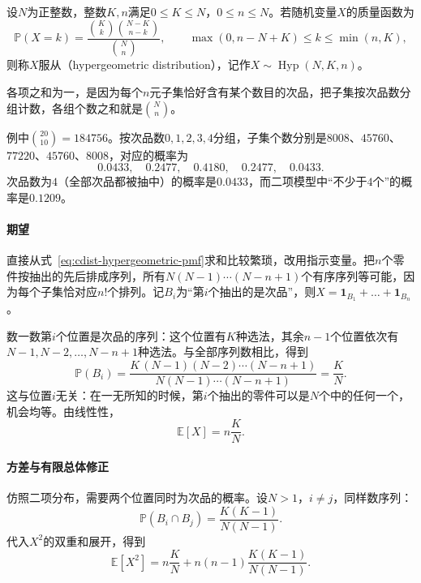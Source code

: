 \begin{definition}[超几何分布]
\label{def:cdist-hypergeometric}
设$N$为正整数，整数$K,n$满足$0\leq K\leq N$，$0\leq n\leq N$。若随机变量$X$的质量函数为
\begin{equation}
  \mathbb{P}(X=k)=\frac{\binom{K}{k}\binom{N-K}{n-k}}{\binom{N}{n}},\qquad
  \max(0,n-N+K)\leq k\leq\min(n,K),
  \label{eq:cdist-hypergeometric-pmf}
\end{equation}
则称$X$服从（hypergeometric distribution），记作$X\sim\operatorname{Hyp}(N,K,n)$。
\end{definition}

各项之和为一，是因为每个$n$元子集恰好含有某个数目的次品，把子集按次品数分组计数，各组个数之和就是$\binom{N}{n}$。

例中$\binom{20}{10}=184756$。按次品数$0,1,2,3,4$分组，子集个数分别是$8008$、$45760$、$77220$、$45760$、$8008$，对应的概率为
\[
  0.0433,\quad 0.2477,\quad 0.4180,\quad 0.2477,\quad 0.0433 .
\]
次品数为$4$（全部次品都被抽中）的概率是$0.0433$，而二项模型中“不少于$4$个”的概率是$0.1209$。

\paragraph{期望}
直接从式~\eqref{eq:cdist-hypergeometric-pmf}求和比较繁琐，改用指示变量。把$n$个零件按抽出的先后排成序列，所有$N(N-1)\cdots(N-n+1)$个有序序列等可能，因为每个子集恰对应$n!$个排列。记$B_i$为“第$i$个抽出的是次品”，则$X=\mathbf{1}_{B_1}+\dots+\mathbf{1}_{B_n}$。

数一数第$i$个位置是次品的序列：这个位置有$K$种选法，其余$n-1$个位置依次有$N-1,N-2,\dots,N-n+1$种选法。与全部序列数相比，得到
\[
  \mathbb{P}(B_i)=\frac{K\,(N-1)(N-2)\cdots(N-n+1)}{N(N-1)\cdots(N-n+1)}=\frac{K}{N}.
\]
这与位置$i$无关：在一无所知的时候，第$i$个抽出的零件可以是$N$个中的任何一个，机会均等。由线性性，
\begin{equation}
  \mathbb{E}[X]=n\frac{K}{N}.
  \label{eq:cdist-hypergeometric-mean}
\end{equation}

\paragraph{方差与有限总体修正}
仿照二项分布，需要两个位置同时为次品的概率。设$N>1$，$i\neq j$，同样数序列：
\[
  \mathbb{P}(B_i\cap B_j)=\frac{K(K-1)}{N(N-1)} .
\]
代入$X^{2}$的双重和展开，得到
\[
  \mathbb{E}[X^{2}]=n\frac{K}{N}+n(n-1)\frac{K(K-1)}{N(N-1)} .
\]

